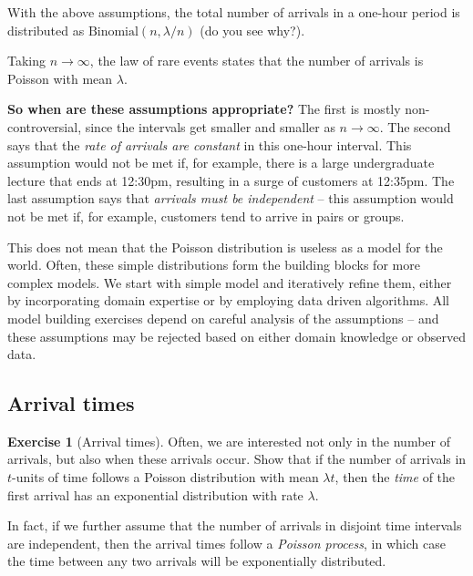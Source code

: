 \documentclass[11pt]{article}
\theoremstyle{definition}
\newtheorem{exercise}[]{Exercise}
\begin{document}
With the above assumptions, the total number of arrivals
in a one-hour period is distributed as
$\text{Binomial}(n, \lambda / n)$ (do you see why?).

Taking $n\rightarrow\infty$, the law of rare events
states that the number
of arrivals is Poisson with mean $\lambda$.

\textbf{So when are these assumptions appropriate?} The first is
mostly non-controversial,
since the intervals get smaller and smaller as  $n\rightarrow\infty$.
The second says that the \textit{rate of arrivals are constant} in this one-hour interval.
This assumption would not be met if, for example, there is a large undergraduate lecture that ends at 12:30pm, resulting in a surge of customers at 12:35pm.
The last assumption says that \textit{arrivals must be independent} -- this assumption would not be met if,
for example, customers tend to arrive in pairs or groups.

This does not mean that the Poisson distribution is useless as a model for the world.
Often, these simple distributions form the building blocks for more complex models. We start with simple model
and iteratively refine them, either by incorporating
domain expertise or by employing data driven algorithms.
All model building exercises depend on careful analysis of the assumptions --
and these assumptions may be rejected based on either
domain knowledge or observed data.

\subsection{Arrival times}

\begin{exercise}[Arrival times]
Often, we are interested not only in the number of arrivals,
but also when these arrivals occur.
Show that if the number of arrivals in $t$-units of time
follows a Poisson distribution with mean $\lambda t$,
then the \textit{time} of the first arrival
has an exponential distribution with rate $\lambda$.

\end{exercise}


In fact, if we further assume that the number of arrivals in
disjoint time intervals are independent, then
the arrival times follow a \textit{Poisson process},
in which case the time between any two arrivals will be exponentially distributed.
\end{document}
